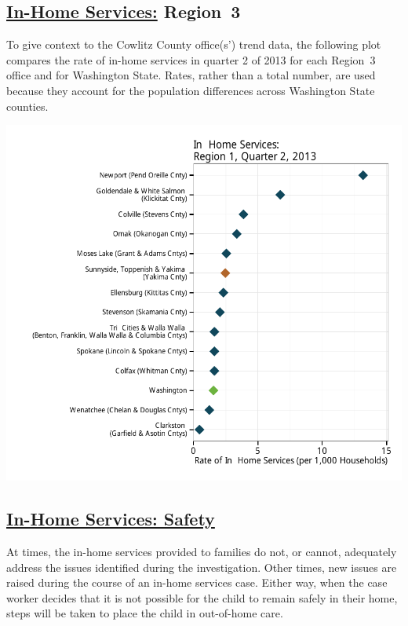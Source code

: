 \documentclass{article}\usepackage[]{graphicx}\usepackage[]{color}
\makeatletter
\def\maxwidth{ %
  \ifdim\Gin@nat@width>\linewidth
    \linewidth
  \else
    \Gin@nat@width
  \fi
}
\newenvironment{knitrout}{}{} %
\makeatother
\begin{document}
\subsection{\href{http://www.partnersforourchildren.org/child-well-being/visualizations/home-services/trends}
    {In-Home Services:} Region~3
}
To give context to the Cowlitz County office(s') trend data, the following plot compares the rate of in-home services in quarter 2 of 2013 for each Region~3 office and for Washington State. Rates, rather than a total number, are used because they account for the population differences across Washington State counties.
\nopagebreak[3]
\begin{knitrout}
\color{fgcolor}

{\centering \includegraphics[width=\maxwidth]{figure/ihs_context} 

}



\end{knitrout}


\newpage

\subsection{\href{http://www.partnersforourchildren.org/child-well-being/visualizations/home-services/safety}
    {In-Home Services: Safety}
}
At times, the in-home services provided to families do not, or cannot, adequately address the issues identified during the investigation. Other times, new issues are raised during the course of an in-home services case. Either way, when the case worker decides that it is not possible for the child to remain safely in their home, steps will be taken to place the child in out-of-home care.
\end{document}
